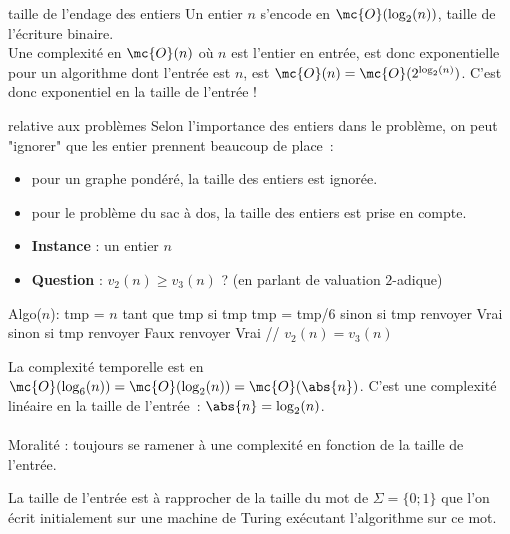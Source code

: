 \begin{exemple}{}{taille de l'endage des entiers}
    Un entier $n$ s'encode en $\mc{O}(\log_2(n))$, taille de l'écriture binaire.\\
    Une complexité en $\mc{O}(n)$ où $n$ est l'entier en entrée, est donc exponentielle pour un algorithme dont l'entrée est $n$, est $\mc{O}(n) = \mc{O}(2^{\log_2(n)})$. C'est donc exponentiel en la taille de l'entrée !
\end{exemple}

\begin{remarque}{}{relative aux problèmes}
    Selon l'importance des entiers dans le problème, on peut "ignorer" que les entier prennent beaucoup de place~:
    \begin{itemize}
        \item pour un graphe pondéré, la taille des entiers est ignorée.
        \item pour le problème du sac à dos, la taille des entiers est prise en compte.
    \end{itemize}
\end{remarque}

\begin{exemple}{}{}
    \begin{itemize}
        \item \textbf{Instance} : un entier $n$
        \item \textbf{Question} : $v_2(n) \geq v_3(n)$ ? (en parlant de valuation $2$-adique)
    \end{itemize}
    \begin{lstLNat}
    Algo($n$):
        tmp = $n$
        tant que tmp%
            si tmp%
                tmp = tmp/6
            sinon si tmp%
                renvoyer Vrai
            sinon si tmp%
                renvoyer Faux
        renvoyer Vrai // $v_2(n) = v_3(n)$
    \end{lstLNat}
    La complexité temporelle est en $\mc{O}(\log_6(n)) = \mc{O}(\log_2(n)) = \mc{O}(\abs{n})$. C'est une complexité linéaire en la taille de l'entrée~: $\abs{n} = \log_2(n)$.\\\\
    Moralité : toujours se ramener à une complexité en fonction de la taille de l'entrée.
\end{exemple}

\begin{remarque}{}{}
    La taille de l'entrée est à rapprocher de la taille du mot de $\Sigma = \{0;1\}$ que l'on écrit initialement sur une machine de Turing exécutant l'algorithme sur ce mot.
\end{remarque}

